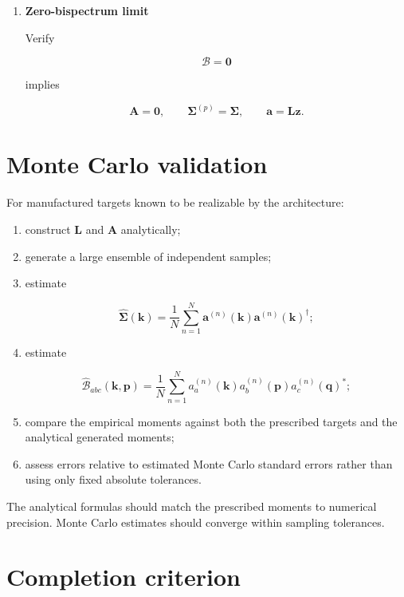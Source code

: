\documentclass[
  11pt,
  a4paper,
]{article}
\begin{document}
\begin{enumerate}
  Verify

  \[
  \boldsymbol d(\boldsymbol k)^\dagger
  \widehat{\boldsymbol u}(\boldsymbol k)
  =
  0.
  \]
\item
  \textbf{Zero-bispectrum limit}

  Verify

  \[
  \mathcal B=\boldsymbol0
  \]

  implies

  \[
  \boldsymbol A=\boldsymbol0,
  \qquad
  \boldsymbol\Sigma^{(p)}=\boldsymbol\Sigma,
  \qquad
  \boldsymbol a=\boldsymbol L\boldsymbol z.
  \]
\end{enumerate}

\section{Monte Carlo validation}\label{monte-carlo-validation}

For manufactured targets known to be realizable by the architecture:

\begin{enumerate}
\def\labelenumi{\arabic{enumi}.}
\item
  construct \(\boldsymbol L\) and \(\boldsymbol A\) analytically;
\item
  generate a large ensemble of independent samples;
\item
  estimate

  \[
  \widehat{\boldsymbol\Sigma}(\boldsymbol k)
  =
  \frac1N
  \sum_{n=1}^{N}
  \boldsymbol a^{(n)}(\boldsymbol k)
  \boldsymbol a^{(n)}(\boldsymbol k)^\dagger;
  \]
\item
  estimate

  \[
  \widehat{\mathcal B}_{abc}(\boldsymbol k,\boldsymbol p)
  =
  \frac1N
  \sum_{n=1}^{N}
  a_a^{(n)}(\boldsymbol k)
  a_b^{(n)}(\boldsymbol p)
  a_c^{(n)}(\boldsymbol q)^*;
  \]
\item
  compare the empirical moments against both the prescribed targets and
  the analytical generated moments;
\item
  assess errors relative to estimated Monte Carlo standard errors rather
  than using only fixed absolute tolerances.
\end{enumerate}

The analytical formulas should match the prescribed moments to numerical
precision. Monte Carlo estimates should converge within sampling
tolerances.

\section{Completion criterion}\label{completion-criterion}
\end{document}
